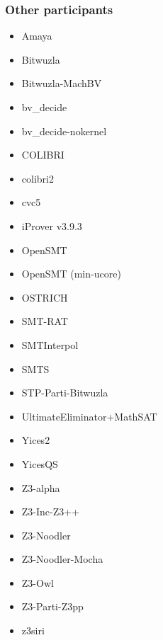 \documentclass[table]{beamer}
\begin{document}
\begin{frame}
  \frametitle{Other participants}

  \begin{center}
  \begin{minipage}{0.49\textwidth}  %
    \begin{itemize}
      \item Amaya
      \item Bitwuzla
      \item Bitwuzla-MachBV
      \item bv\_decide
      \item bv\_decide-nokernel
      \item COLIBRI
      \item colibri2
      \item cvc5
      \item iProver v3.9.3
      \item OpenSMT
      \item OpenSMT (min-ucore)
      \item OSTRICH
      \item SMT-RAT
    \end{itemize}
  \end{minipage}
  \begin{minipage}{0.49\textwidth}  %
    \begin{itemize}
      \item SMTInterpol
      \item SMTS
      \item STP-Parti-Bitwuzla
      \item UltimateEliminator+MathSAT
      \item Yices2
      \item YicesQS
      \item Z3-alpha
      \item Z3-Inc-Z3++
      \item Z3-Noodler
      \item Z3-Noodler-Mocha
      \item Z3-Owl
      \item Z3-Parti-Z3pp
      \item z3siri
     \end{itemize}
  \end{minipage}
  \end{center}

\end{frame}
\end{document}
